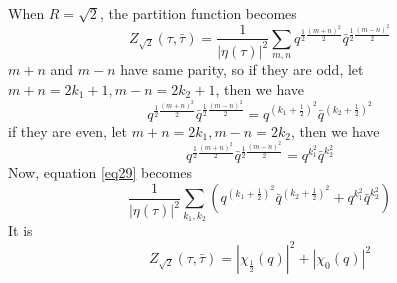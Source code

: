 \subsubsection{}
When $R= \sqrt{2}$, the partition function becomes
\begin{equation}
\label{eq29}
	Z_{\sqrt{2}}(\tau, \bar{\tau}) = \frac{1}{|\eta(\tau)|^2} \sum_{m,n} q^{\frac{1}{2} \frac{(m+n)^2}{2}} \bar{q}^{\frac{1}{2}\frac{(m-n)^2}{2}}
\end{equation}
$m+n$ and $m-n$ have same parity, so if they are odd, let $m+n = 2k_1 +1, m-n = 2k_2 +1$, then we have 
\begin{equation}
q^{\frac{1}{2} \frac{(m+n)^2}{2}} \bar{q}^{\frac{1}{2} \frac{(m-n)^2}{2}} = q^{(k_1 + \frac{1}{2})^2}\bar{q}^{(k_2 + \frac{1}{2})^2}
\end{equation}
if they are even, let $m+n = 2k_1, m-n = 2k_2 $, then we have 
\begin{equation}
	q^{\frac{1}{2} \frac{(m+n)^2}{2}} \bar{q}^{\frac{1}{2} \frac{(m-n)^2}{2}} = q^{k_1^2} \bar{q}^{k_2^2}
\end{equation}
Now, equation \ref{eq29} becomes
\begin{equation}
	\frac{1}{|\eta(\tau)|^2} \sum_{k_1,k_2}\left(q^{(k_1 + \frac{1}{2})^2} \bar{q}^{(k_2 + \frac{1}{2})^2} + q^{k_1^2}\bar{q}^{k_2^2}  \right)
\end{equation}
It is 
\begin{equation}
	Z_{\sqrt{2}}(\tau, \bar{\tau}) = |\chi_{\frac{1}{2}}(q)|^2 + |\chi_0 (q)|^2
\end{equation}
